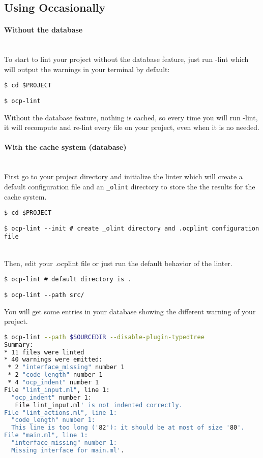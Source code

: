 \subsection{Using Occasionally}
\paragraph{Without the database}~\\

To start to lint your project without the database feature, just run \ocp-lint{}
which will output the warnings in your terminal by default:

  {\tt \$ cd \$PROJECT}

  {\tt \$ ocp-lint}

Without the database feature, nothing is cached, so every time you will run
\ocp-lint{}, it will recompute and re-lint every file on your project, even when
it is no needed.

\paragraph{With the cache system (database)}~\\

First go to your project directory and initialize the linter which will create a
default configuration file and an {\tt \_olint} directory to store the the
results for the cache system.

  {\tt \$ cd \$PROJECT}

  {\tt \$ ocp-lint \--\--init \# create \_olint directory and .ocplint
    configuration file}

~\\  
Then, edit your .ocplint file or just run the default behavior of the linter.

  {\tt \$ ocp-lint \# default directory is .} 

  {\tt \$ ocp-lint \--\--path src/ }

You will get some entries in your database showing the different warning of your
project. 

\begin{lstlisting}[language=bash,basicstyle=\tt\small]
$ ocp-lint --path $SOURCEDIR --disable-plugin-typedtree
Summary:
* 11 files were linted
* 40 warnings were emitted:
 * 2 "interface_missing" number 1
 * 2 "code_length" number 1
 * 4 "ocp_indent" number 1
File "lint_input.ml", line 1:
  "ocp_indent" number 1:
   File lint_input.ml' is not indented correctly.
File "lint_actions.ml", line 1:
  "code_length" number 1:
  This line is too long ('82'): it should be at most of size '80'.
File "main.ml", line 1:
  "interface_missing" number 1:
  Missing interface for main.ml'.
\end{lstlisting}              

